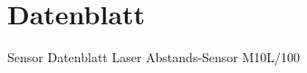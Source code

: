 \label{cha:anhang_a}


\section{Datenblatt}
\label{sec:datenblatt}

Sensor Datenblatt Laser Abstands-Sensor M10L/100




